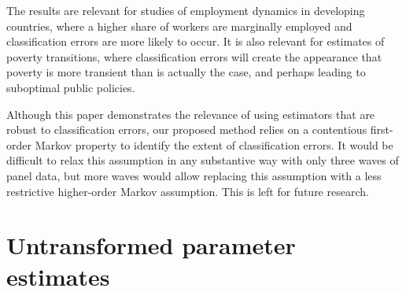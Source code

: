 \documentclass[letterpaper,12pt,final,dvipsnames]{article}
\begin{document}
The results are relevant for studies of employment dynamics in developing countries, where a higher share of workers are marginally employed and classification errors are more likely to occur. It is also relevant for estimates of poverty transitions, where classification errors will create the appearance that poverty is more transient than is actually the case, and perhaps leading to suboptimal public policies. 

Although this paper demonstrates the relevance of using estimators that are robust to classification errors, our proposed method relies on a contentious first-order Markov property to identify the extent of classification errors. It would be difficult to relax this assumption in any substantive way with only three waves of panel data, but more waves would allow replacing this assumption with a less restrictive higher-order Markov assumption. This is left for future research. 





\begingroup
{}

\clearpage
	
	
%	
\endgroup


\appendix

\section{Untransformed parameter estimates}


%

%



\end{document}
